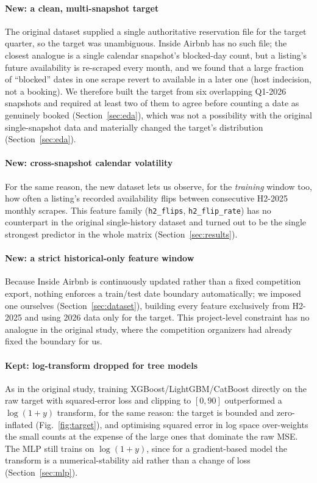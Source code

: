 \documentclass[journal]{IEEEtran}
\begin{document}
\paragraph{New: a clean, multi-snapshot target} The original dataset supplied a
single authoritative reservation file for the target quarter, so the target was
unambiguous. Inside Airbnb has no such file; the closest analogue is a single
calendar snapshot's blocked-day count, but a listing's future availability is
re-scraped every month, and we found that a large fraction of ``blocked'' dates
in one scrape revert to available in a later one (host indecision, not a
booking). We therefore built the target from six overlapping Q1-2026 snapshots
and required at least two of them to agree before counting a date as
genuinely booked (Section~\ref{sec:eda}), which was not a
possibility with the original single-snapshot data and materially changed the
target's distribution (Section~\ref{sec:eda}).

\paragraph{New: cross-snapshot calendar volatility} For the same reason, the
new dataset lets us observe, for the \emph{training} window too, how often a
listing's recorded availability flips between consecutive H2-2025 monthly
scrapes. This feature family (\texttt{h2\_flips}, \texttt{h2\_flip\_rate}) has
no counterpart in the original single-history dataset and turned out to be the
single strongest predictor in the whole matrix (Section~\ref{sec:results}).

\paragraph{New: a strict historical-only feature window} Because Inside Airbnb
is continuously updated rather than a fixed competition export, nothing
enforces a train/test date boundary automatically; we imposed one ourselves
(Section~\ref{sec:dataset}), building every feature exclusively from H2-2025
and using 2026 data only for the target. This project-level constraint has no
analogue in the original study, where the competition organizers had already
fixed the boundary for us.

\paragraph{Kept: log-transform dropped for tree models} As in the original
study, training XGBoost/LightGBM/CatBoost directly on the raw target with
squared-error loss and clipping to $[0,90]$ outperformed a $\log(1+y)$
transform, for the same reason: the target is bounded and zero-inflated
(Fig.~\ref{fig:target}), and optimising squared error in log space
over-weights the small counts at the expense of the large ones that dominate
the raw MSE. The MLP still trains on $\log(1+y)$, since for a gradient-based
model the transform is a numerical-stability aid rather than a change of loss
(Section~\ref{sec:mlp}).
\end{document}
